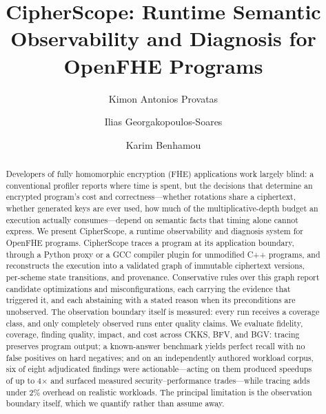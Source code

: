 \documentclass[sigconf,nonacm]{acmart}
\begin{document}
\title{CipherScope: Runtime Semantic Observability and Diagnosis for OpenFHE Programs}

\author{Kimon Antonios Provatas}

\author{Ilias Georgakopoulos-Soares}

\author{Karim Benhamou}

\begin{abstract}
Developers of fully homomorphic encryption (FHE) applications work largely
blind: a conventional profiler reports where time is spent, but the decisions
that determine an encrypted program's cost and correctness---whether rotations
share a ciphertext, whether generated keys are ever used, how much of the
multiplicative-depth budget an execution actually consumes---depend on
semantic facts that timing alone cannot express. We present CipherScope, a
runtime observability and diagnosis system for OpenFHE programs. CipherScope
traces a program at its application boundary, through a Python proxy or a GCC
compiler plugin for unmodified C++ programs, and reconstructs the execution
into a validated graph of immutable ciphertext versions, per-scheme state
transitions, and provenance. Conservative rules over this graph report
candidate optimizations and misconfigurations, each carrying the evidence
that triggered it, and each abstaining with a stated reason when its
preconditions are unobserved. The observation boundary itself is measured:
every run receives a coverage class, and only completely observed runs enter
quality claims. We evaluate fidelity, coverage, finding quality, impact, and
cost across CKKS, BFV, and BGV: tracing preserves program output; a
known-answer benchmark yields perfect recall with no false positives on hard
negatives; and on an independently authored workload corpus, six of eight
adjudicated findings were actionable---acting on them produced speedups of up
to 4$\times$ and surfaced measured security--performance trades---while
tracing adds under 2\% overhead on realistic workloads. The principal
limitation is the observation boundary itself, which we quantify rather than
assume away.
\end{abstract}

\maketitle
\end{document}
